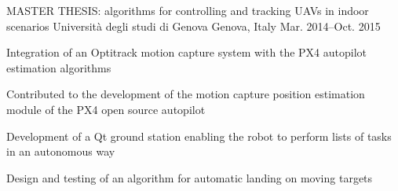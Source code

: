 


\begin{cventries}
  \cventry
  {MASTER THESIS: algorithms for controlling and tracking UAVs in indoor scenarios} %
  {Università degli studi di Genova} %
  {Genova, Italy} %
  {Mar. 2014–Oct. 2015} %
  {
    \begin{cvitems} %
      \item {Integration of an Optitrack motion capture system with the PX4 autopilot estimation algorithms}
      \item {Contributed to the development of the motion capture position estimation module of the PX4 open source autopilot}
      \item {Development of a Qt ground station enabling the robot to perform lists of tasks in an autonomous way}
      \item {Design and testing of an algorithm for automatic landing on moving targets}
    \end{cvitems}
  }


\end{cventries}

